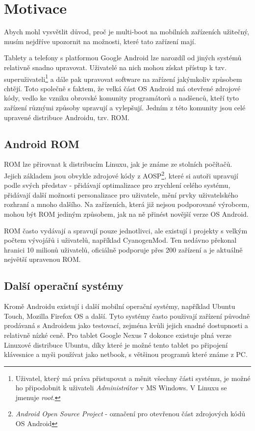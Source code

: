 \documentclass[12pt, a4paper, oneside]{article}
\newcommand{\It}{\textit}  %
\begin{document}
\newpage
\section{Motivace}
Abych mohl vysvětlit důvod, proč je multi-boot na mobilních zařízeních užitečný, musím nejdříve upozornit na možnosti, které tato zařízení mají.

Tablety a telefony s platformou Google Android lze narozdíl od jiných systémů relativně snadno upravovat. Uživatelé na nich mohou získat přístup k tzv. superuživateli\footnote{Uživatel, který má práva přistupovat a měnit všechny části systému, je možné ho připodobnit k uživateli \It{Administrátor} v MS Windows. V Linuxu se jmenuje \It{root}.} a dále pak upravovat software na zařízení jakýmkoliv způsobem chtějí. Toto společně s faktem, že velká část OS Android má otevřené zdrojové kódy, vedlo ke vzniku obrovské komunity programátorů a nadšenců, kteří tyto zařízení různými způsoby upravují a vylepšují. Jedním z  této komunity jsou celé upravené distribuce Androidu, tzv. ROM.

\subsection{Android ROM}
ROM lze přirovnat k distribucím Linuxu, jak je známe ze stolních počítačů. Jejich základem jsou obvykle zdrojové kódy z AOSP\cite{aosp}\footnote{\It{Android Open Source Project} - označení pro otevřenou část zdrojových kódů OS Android}, které si autoři upravují podle svých představ - přidávají optimalizace pro zrychlení celého systému, přidávají další možnosti personalizace pro uživatele, mění prvky uživatelského rozhraní a mnoho dalšího. Na zařízeních, která již nejsou podporované výrobcem, mohou být ROM jediným způsobem, jak na ně přinést novější verze OS Android.

ROM často vydávají a spravují pouze jednotlivci, ale existují i projekty s velkým počtem vývojářů i uživatelů, například CyanogenMod\cite{CM}. Ten nedávno překonal hranici 10 milionů uživatelů, oficiálně podporuje přes 200 zařízení a je aktuálně největší upravenou ROM.

\subsection{Další operační systémy}
Kromě Androidu existují i další mobilní operační systémy, například Ubuntu Touch\cite{utouch}, Mozilla Firefox OS\cite{firefoxos} a další. Tyto systémy často použivají zařízení původně prodávaná s Androidem jako testovací, zejména kvůli jejich snadné dostupnosti a relativně nízké ceně. Pro tablet Google Nexus 7 dokonce existuje plná verze Linuxové distribuce Ubuntu, díky které je možné tento tablet po připojení klávesnice a myši používat jako netbook, s většinou programů které známe z PC.
\end{document}
